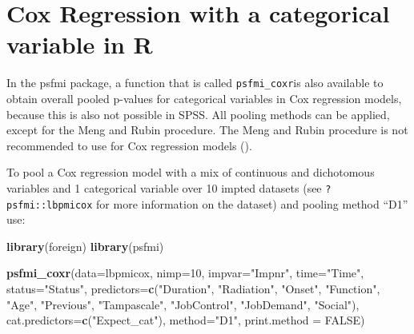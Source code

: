 \documentclass[]{book}
\newenvironment{Shaded}{\begin{snugshade}}{\end{snugshade}}
\newcommand{\KeywordTok}[1]{\textcolor[rgb]{0.13,0.29,0.53}{\textbf{#1}}}
\newcommand{\DataTypeTok}[1]{\textcolor[rgb]{0.13,0.29,0.53}{#1}}
\newcommand{\DecValTok}[1]{\textcolor[rgb]{0.00,0.00,0.81}{#1}}
\newcommand{\StringTok}[1]{\textcolor[rgb]{0.31,0.60,0.02}{#1}}
\newcommand{\OtherTok}[1]{\textcolor[rgb]{0.56,0.35,0.01}{#1}}
\newcommand{\NormalTok}[1]{#1}
\begin{document}
\section{Cox Regression with a categorical variable in
R}\label{cox-regression-with-a-categorical-variable-in-r}

In the psfmi package, a function that is called \texttt{psfmi\_coxr}is
also available to obtain overall pooled p-values for categorical
variables in Cox regression models, because this is also not possible in
SPSS. All pooling methods can be applied, except for the Meng and Rubin
procedure. The Meng and Rubin procedure is not recommended to use for
Cox regression models (\citet{Marshall2009MedResMeth}).

To pool a Cox regression model with a mix of continuous and dichotomous
variables and 1 categorical variable over 10 impted datasets (see
\texttt{?psfmi::lbpmicox} for more information on the dataset) and
pooling method ``D1'' use:

\begin{Shaded}
\begin{Highlighting}[]
\KeywordTok{library}\NormalTok{(foreign)}
\KeywordTok{library}\NormalTok{(psfmi)}

\KeywordTok{psfmi_coxr}\NormalTok{(}\DataTypeTok{data=}\NormalTok{lbpmicox, }\DataTypeTok{nimp=}\DecValTok{10}\NormalTok{, }\DataTypeTok{impvar=}\StringTok{"Impnr"}\NormalTok{, }\DataTypeTok{time=}\StringTok{"Time"}\NormalTok{, }\DataTypeTok{status=}\StringTok{"Status"}\NormalTok{,}
  \DataTypeTok{predictors=}\KeywordTok{c}\NormalTok{(}\StringTok{"Duration"}\NormalTok{, }\StringTok{"Radiation"}\NormalTok{, }\StringTok{"Onset"}\NormalTok{, }\StringTok{"Function"}\NormalTok{, }\StringTok{"Age"}\NormalTok{,}
  \StringTok{"Previous"}\NormalTok{, }\StringTok{"Tampascale"}\NormalTok{, }\StringTok{"JobControl"}\NormalTok{, }\StringTok{"JobDemand"}\NormalTok{, }\StringTok{"Social"}\NormalTok{), }
  \DataTypeTok{cat.predictors=}\KeywordTok{c}\NormalTok{(}\StringTok{"Expect_cat"}\NormalTok{), }\DataTypeTok{method=}\StringTok{"D1"}\NormalTok{, }\DataTypeTok{print.method =} \OtherTok{FALSE}\NormalTok{)}
\end{Highlighting}
\end{Shaded}
\end{document}
